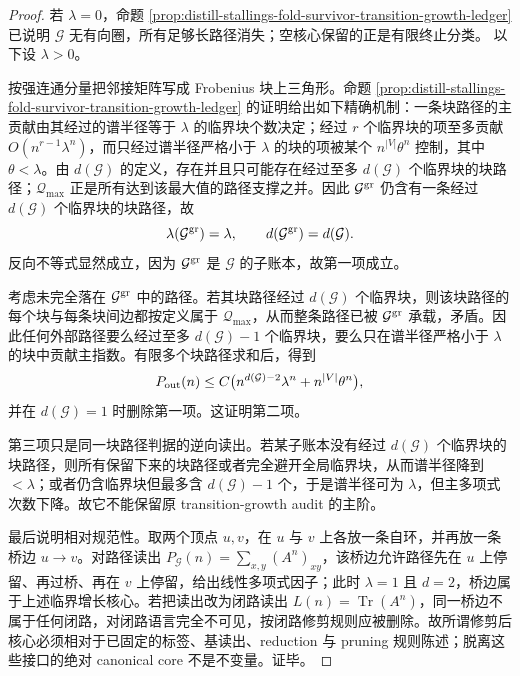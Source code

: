 \begin{proof}
若 \(\lambda=0\)，命题 \ref{prop:distill-stallings-fold-survivor-transition-growth-ledger} 已说明
\(\mathcal G\) 无有向圈，所有足够长路径消失；空核心保留的正是有限终止分类。
以下设 \(\lambda>0\)。

按强连通分量把邻接矩阵写成 Frobenius 块上三角形。命题
\ref{prop:distill-stallings-fold-survivor-transition-growth-ledger} 的证明给出如下精确机制：一条块路径的主贡献由其经过的谱半径等于
\(\lambda\) 的临界块个数决定；经过 \(r\) 个临界块的项至多贡献
\(O(n^{r-1}\lambda^n)\)，而只经过谱半径严格小于 \(\lambda\) 的块的项被某个
\(n^{|V|}\theta^n\) 控制，其中 \(\theta<\lambda\)。由 \(d(\mathcal G)\) 的定义，存在并且只可能存在经过至多
\(d(\mathcal G)\) 个临界块的块路径；\(\mathscr Q_{\max}\) 正是所有达到该最大值的路径支撑之并。因此
\(\mathcal G^{\rm gr}\) 仍含有一条经过 \(d(\mathcal G)\) 个临界块的块路径，故
\[
\lambda(\mathcal G^{\rm gr})=\lambda,\qquad
 d(\mathcal G^{\rm gr})=d(\mathcal G).
\]
反向不等式显然成立，因为 \(\mathcal G^{\rm gr}\) 是 \(\mathcal G\) 的子账本，故第一项成立。

考虑未完全落在 \(\mathcal G^{\rm gr}\) 中的路径。若其块路径经过
\(d(\mathcal G)\) 个临界块，则该块路径的每个块与每条块间边都按定义属于
\(\mathscr Q_{\max}\)，从而整条路径已被 \(\mathcal G^{\rm gr}\) 承载，矛盾。因此任何外部路径要么经过至多
\(d(\mathcal G)-1\) 个临界块，要么只在谱半径严格小于 \(\lambda\) 的块中贡献主指数。有限多个块路径求和后，得到
\[
P_{\rm out}(n)\le
C\bigl(n^{d(\mathcal G)-2}\lambda^n+n^{|V|}\theta^n\bigr),
\]
并在 \(d(\mathcal G)=1\) 时删除第一项。这证明第二项。

第三项只是同一块路径判据的逆向读出。若某子账本没有经过 \(d(\mathcal G)\) 个临界块的块路径，则所有保留下来的块路径或者完全避开全局临界块，从而谱半径降到
\(<\lambda\)；或者仍含临界块但最多含 \(d(\mathcal G)-1\) 个，于是谱半径可为
\(\lambda\)，但主多项式次数下降。故它不能保留原 transition-growth audit 的主阶。

最后说明相对规范性。取两个顶点 \(u,v\)，在 \(u\) 与 \(v\) 上各放一条自环，并再放一条桥边
\(u\to v\)。对路径读出 \(P_{\mathcal G}(n)=\sum_{x,y}(A^n)_{xy}\)，该桥边允许路径先在
\(u\) 上停留、再过桥、再在 \(v\) 上停留，给出线性多项式因子；此时
\(\lambda=1\) 且 \(d=2\)，桥边属于上述临界增长核心。若把读出改为闭路读出
\(L(n)=\operatorname{Tr}(A^n)\)，同一桥边不属于任何闭路，对闭路语言完全不可见，按闭路修剪规则应被删除。故所谓修剪后核心必须相对于已固定的标签、基读出、reduction 与 pruning 规则陈述；脱离这些接口的绝对 canonical core 不是不变量。证毕。
\end{proof}

